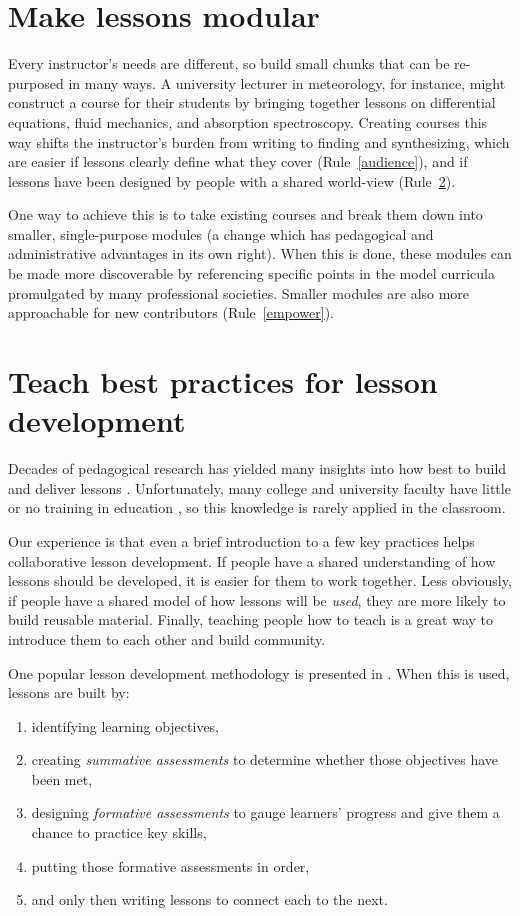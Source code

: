 \documentclass[10pt,letterpaper]{article}
\newcommand{\rulemajor}[2]{\section{#1}\label{#2}}
\newcommand{\ruleref}[1]{Rule~\ref{#1}}
\begin{document}
\rulemajor{Make lessons modular}{modular}

Every instructor's needs are different,
so build small chunks that can be re-purposed in many ways.
A university lecturer in meteorology,
for instance,
might construct a course for their students by bringing together lessons on differential equations,
fluid mechanics,
and absorption spectroscopy.
Creating courses this way shifts the instructor's burden from writing to finding and synthesizing,
which are easier if lessons clearly define what they cover (\ruleref{audience}),
and if lessons have been designed by people with a shared world-view (\ruleref{practices}).

One way to achieve this is to take existing courses and break them down into smaller, single-purpose modules
(a change which has pedagogical and administrative advantages in its own right).
When this is done,
these modules can be made more discoverable
by referencing specific points in the model curricula promulgated by many professional societies.
Smaller modules are also more approachable for new contributors (\ruleref{empower}).

\rulemajor{Teach best practices for lesson development}{practices}

Decades of pedagogical research has yielded many insights into
how best to build and deliver lessons \cite{hlw}.
Unfortunately,
many college and university faculty have little or no training in education \cite{brownell},
so this knowledge is rarely applied in the classroom.

Our experience is that even a brief introduction to a few key practices
helps collaborative lesson development.
If people have a shared understanding of how lessons should be developed,
it is easier for them to work together.
Less obviously,
if people have a shared model of how lessons will be \emph{used},
they are more likely to build reusable material.
Finally,
teaching people how to teach is a great way to introduce them to each other and build community.

One popular lesson development methodology is presented in \cite{wiggins-mctighe}.
When this is used,
lessons are built by:

\begin{enumerate}

  \item
    identifying learning objectives,

  \item
    creating \emph{summative assessments} to determine whether those objectives have been met,

  \item
    designing \emph{formative assessments} to gauge learners' progress
    and give them a chance to practice key skills,

  \item
    putting those formative assessments in order,

  \item
    and only then writing lessons to connect each to the next.

\end{enumerate}
\end{document}
